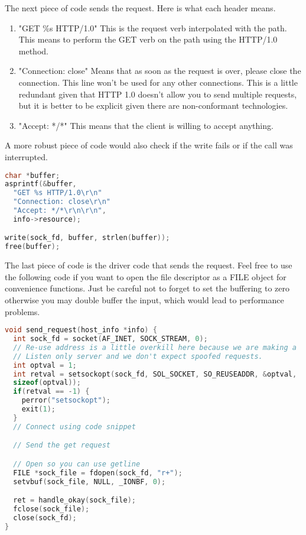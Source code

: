 The next piece of code sends the request. Here is what each header means.

\begin{enumerate}
  \item "GET \%s HTTP/1.0" This is the request verb interpolated with the path. This means to perform the GET verb on the path using the HTTP/1.0 method.
  \item "Connection: close" Means that as soon as the request is over, please close the connection. This line won't be used for any other connections.
    This is a little redundant given that HTTP 1.0 doesn't allow you to send multiple requests, but it is better to be explicit given there are non-conformant technologies.
  \item "Accept: */*" This means that the client is willing to accept anything.
\end{enumerate}

A more robust piece of code would also check if the write fails or if the call was interrupted.

\begin{lstlisting}[language=C]
char *buffer;
asprintf(&buffer,
  "GET %s HTTP/1.0\r\n"
  "Connection: close\r\n"
  "Accept: */*\r\n\r\n",
  info->resource);

write(sock_fd, buffer, strlen(buffer));
free(buffer);
\end{lstlisting}

The last piece of code is the driver code that sends the request.
Feel free to use the following code if you want to open the file descriptor as a FILE object for convenience functions.
Just be careful not to forget to set the buffering to zero otherwise you may double buffer the input, which would lead to performance problems.

\begin{lstlisting}[language=C]
void send_request(host_info *info) {
  int sock_fd = socket(AF_INET, SOCK_STREAM, 0);
  // Re-use address is a little overkill here because we are making a
  // Listen only server and we don't expect spoofed requests.
  int optval = 1;
  int retval = setsockopt(sock_fd, SOL_SOCKET, SO_REUSEADDR, &optval,
  sizeof(optval));
  if(retval == -1) {
    perror("setsockopt");
    exit(1);
  }
  // Connect using code snippet

  // Send the get request

  // Open so you can use getline
  FILE *sock_file = fdopen(sock_fd, "r+");
  setvbuf(sock_file, NULL, _IONBF, 0);

  ret = handle_okay(sock_file);
  fclose(sock_file);
  close(sock_fd);
}
\end{lstlisting}

